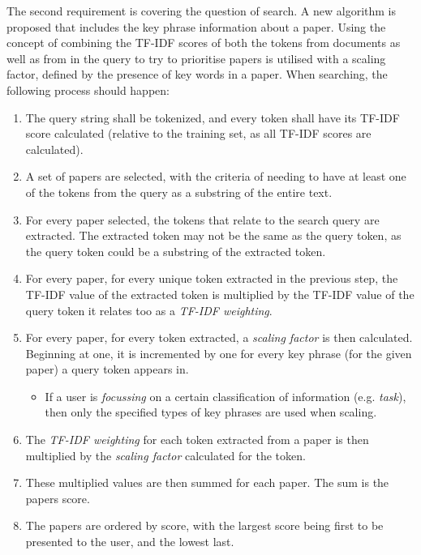The second requirement is covering the question of search. A new algorithm is proposed that includes the key phrase information about a paper. Using the concept of combining the TF-IDF scores of both the tokens from documents as well as from in the query to try to prioritise papers is utilised with a scaling factor, defined by the presence of key words in a paper. When searching, the following process should happen:
\begin{enumerate}
	\item The query string shall be tokenized, and every token shall have its TF-IDF score calculated (relative to the training set, as all TF-IDF scores are calculated).
	\item A set of papers are selected, with the criteria of needing to have at least one of the tokens from the query as a substring of the entire text.
	\item For every paper selected, the tokens that relate to the search query are extracted. The extracted token may not be the same as the query token, as the query token could be a substring of the extracted token.
	\item For every paper, for every unique token extracted in the previous step, the TF-IDF value of the extracted token is multiplied by the TF-IDF value of the query token it relates too as a \textit{TF-IDF weighting}. 
	\item For every paper, for every token extracted, a \textit{scaling factor} is then calculated. Beginning at one, it is incremented by one for every key phrase (for the given paper) a query token appears in.
	\begin{itemize}
		\item If a user is \textit{focussing} on a certain classification of information (e.g. \textit{task}), then only the specified types of key phrases are used when scaling.
	\end{itemize}
	\item The \textit{TF-IDF weighting} for each token extracted from a paper is then multiplied by the \textit{scaling factor} calculated for the token.
	\item These multiplied values are then summed for each paper. The sum is the papers score.
	\item The papers are ordered by score, with the largest score being first to be presented to the user, and the lowest last.
\end{enumerate}

